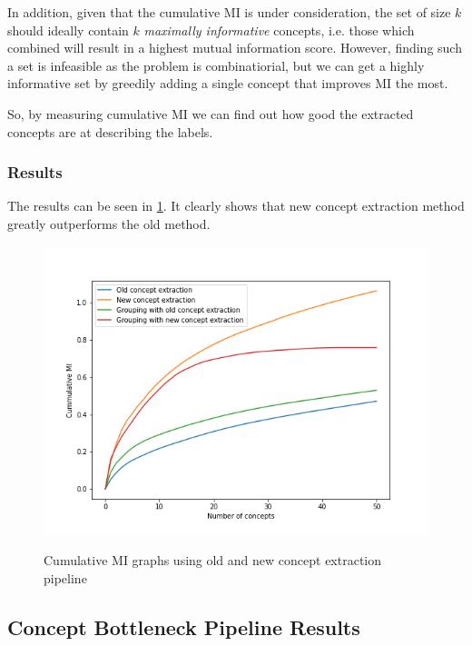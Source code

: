 In addition, given that the cumulative MI is under consideration, the set of size $k$ should ideally contain $k$ \emph{maximally informative} concepts, i.e. those which combined will result in a highest mutual information score.
However, finding such a set is infeasible as the problem is combinatiorial, but we can get a highly informative set by greedily adding a single concept that improves MI the most. 

So, by measuring cumulative MI we can find out how good the extracted concepts are at describing the labels.

\subsubsection{Results}

The results can be seen in \ref{cummulative-mi-graphs}.
It clearly shows that new concept extraction method greatly outperforms the old method.

\begin{figure}[h]
\caption{Cumulative MI graphs using old and new concept extraction pipeline}
\centering
\includegraphics[width=\textwidth]{evaluation/Cummulative MI graphs.png}
\label{cummulative-mi-graphs}
\end{figure}


\subsection{Concept Bottleneck Pipeline Results}

